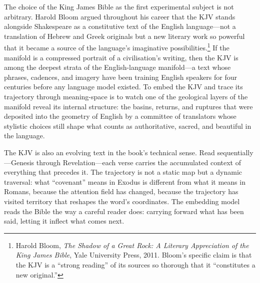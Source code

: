 
The choice of the King James Bible as the first experimental subject is not arbitrary. Harold Bloom argued throughout his career that the KJV stands alongside Shakespeare as a constitutive text of the English language---not a translation of Hebrew and Greek originals but a new literary work so powerful that it became a source of the language's imaginative possibilities.\footnote{Harold Bloom, \emph{The Shadow of a Great Rock: A Literary Appreciation of the King James Bible}, Yale University Press, 2011. Bloom's specific claim is that the KJV is a ``strong reading'' of its sources so thorough that it ``constitutes a new original.''} If the manifold is a compressed portrait of a civilisation's writing, then the KJV is among the deepest strata of the English-language manifold---a text whose phrases, cadences, and imagery have been training English speakers for four centuries before any language model existed. To embed the KJV and trace its trajectory through meaning-space is to watch one of the geological layers of the manifold reveal its internal structure: the basins, returns, and ruptures that were deposited into the geometry of English by a committee of translators whose stylistic choices still shape what counts as authoritative, sacred, and beautiful in the language.

The KJV is also an evolving text in the book's technical sense. Read sequentially---Genesis through Revelation---each verse carries the accumulated context of everything that precedes it. The trajectory is not a static map but a dynamic traversal: what ``covenant'' means in Exodus is different from what it means in Romans, because the attention field has changed, because the trajectory has visited territory that reshapes the word's coordinates. The embedding model reads the Bible the way a careful reader does: carrying forward what has been said, letting it inflect what comes next.
